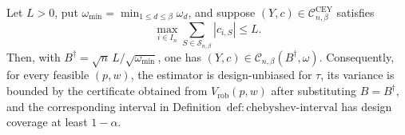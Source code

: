 Let \(L>0\), put \(\omega_{\min}=\min_{1\le d\le\beta}\omega_d\), and suppose \((Y,c)\in\mathcal C^{\mathrm{CEY}}_{n,\beta}\) satisfies
\[
\max_{i\in I_n}\sum_{S\in\mathcal S_{n,\beta}}|c_{i,S}|\le L.
\]
Then, with \(B^\dagger=\sqrt n\,L/\sqrt{\omega_{\min}}\), one has \((Y,c)\in\mathcal C_{n,\beta}(B^\dagger,\omega)\).  Consequently, for every feasible \((p,w)\), the estimator is design-unbiased for \(\tau\), its variance is bounded by the certificate obtained from \(V_{\mathrm{rob}}(p,w)\) after substituting \(B=B^\dagger\), and the corresponding interval in Definition~\(\mathrm{def{:}chebyshev\text{-}interval}\) has design coverage at least \(1-\alpha\).